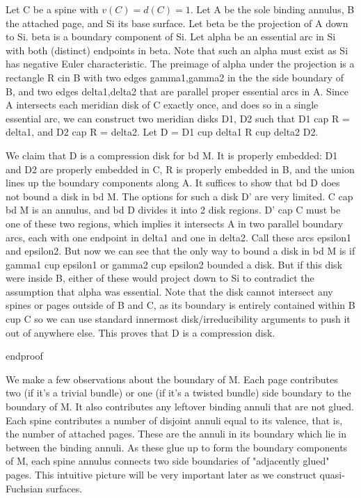 
Let C be a spine with $v(C)=d(C)=1$. Let A be the sole binding annulus, B the
attached page, and Si its base surface. Let beta be the projection of A down to
Si. beta is a boundary component of Si. Let alpha be an essential arc in Si
with both (distinct) endpoints in beta. Note that such an alpha must exist as
Si has negative Euler characteristic. The preimage of alpha under the
projection is a rectangle R cin B with two edges gamma1,gamma2 in the the side
boundary of B, and two edges delta1,delta2 that are parallel proper essential
arcs in A.  Since A intersects each meridian disk of C exactly once, and does
so in a single essential arc, we can construct two meridian disks D1, D2 such
that D1 cap R = delta1, and D2 cap R = delta2. Let D = D1 cup delta1 R cup
delta2 D2.

We claim that D is a compression disk for bd M. It is properly embedded: D1 and
D2 are properly embedded in C, R is properly embedded in B, and the union lines
up the boundary components along A. It suffices to show that bd D does not
bound a disk in bd M. The options for such a disk D' are very limited. C cap bd
M is an annulus, and bd D divides it into 2 disk regions. D' cap C must be one
of these two regions, which implies it intersects A in two parallel boundary
arcs, each with one endpoint in delta1 and one in delta2. Call these arcs
epsilon1 and epsilon2. But now we can see that the only way to bound a disk in
bd M is if gamma1 cup epsilon1 or gamma2 cup epsilon2 bounded a disk. But if
this disk were inside B, either of these would project down to Si to contradict
the assumption that alpha was essential. Note that the disk cannot intersect
any spines or pages outside of B and C, as its boundary is entirely contained
within B cup C so we can use standard innermost disk/irreducibility arguments
to push it out of anywhere else. This proves that D is a compression disk.

endproof

We make a few observations about the boundary of M. Each page contributes two
(if it's a trivial bundle) or one (if it's a twisted bundle) side boundary to
the boundary of M. It also contributes any leftover binding annuli that are not
glued. Each spine contributes a number of disjoint annuli equal to its valence,
that is, the number of attached pages. These are the annuli in its boundary
which lie in between the binding annuli. As these glue up to form the boundary
components of M, each spine annulus connects two side boundaries of "adjacently
glued" pages. This intuitive picture will be very important later as we
construct quasi-Fuchsian surfaces.

